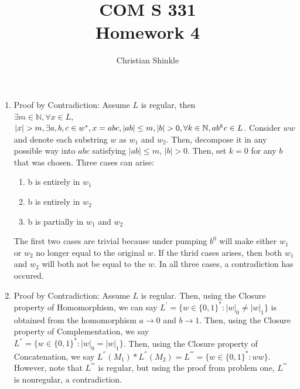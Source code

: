 \documentclass{article}
\newcommand{\Naturals}{\mathbb{N}}   %
\newcommand{\ra}{\rightarrow}
\begin{document}
 	\title{COM S 331\large \\Homework 4}
	\author{Christian Shinkle}
	\maketitle
	\begin{enumerate}
		\item Proof by Contradiction: Assume $L$ is regular, then\\ $\exists m\in \Naturals,\forall x\in L$, $|x|>m, \exists a, b, c \in w^*, x=abc, |ab|\leq m, |b|>0,\\ \forall k\in\Naturals, ab^{k}c\in L$.
		Consider $ww$ and denote each substring $w$ as $w_1$ and $w_2$. Then, decompose it in any possible way into $abc$ satisfying $|ab|\leq m$,	$|b|>0$. Then, set $k=0$ for any $b$ that was chosen. Three cases can arise: 
		\begin{enumerate}
			\item b is entirely in $w_1$
			\item b is entirely in $w_2$
			\item b is partially in $w_1$ and $w_2$
		\end{enumerate}
		The first two cases are trivial because under pumping $b^0$ will make either $w_1$ or $w_2$ no longer equal to the original $w$. If the thrid cases arises, then both $w_1$ and $w_2$ will both not be equal to the $w$. In all three cases, a contradiction has occured.
		\item Proof by Contradiction: Assume $L$ is regular. 
		Then, using the Closure property of Homomorphism, we can say $L^{'}=\{w\in \{0,1\}^*:|w|_0\neq|w|_1\}$ is obtained from the homomorphism $a\ra0$ and $b\ra1$. 
		Then, using the Closure property of Complementation, we say\\ $L^{''}=\{w\in \{0,1\}^*:|w|_0=|w|_1\}$. 
		Then, using the Closure property of Concatenation, we say $L^{''}(M_1)*L^{''}(M_2)=L^{'''}=\{w\in \{0,1\}^*: ww\}$. However, note that $L^{'''}$ is regular, but using the proof from problem one, $L^{'''}$ is nonregular, a contradiction.
	\end{enumerate}
 
\end{document}
